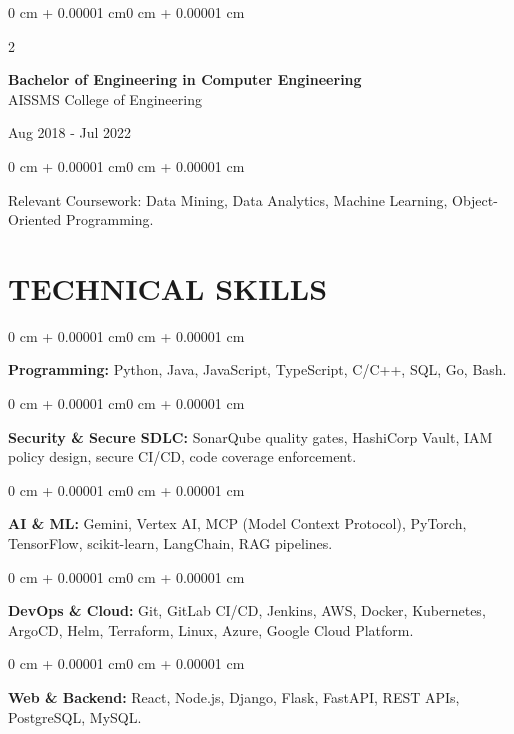 \documentclass[10pt, letterpaper]{article}
\newenvironment{onecolentry}{
    \begin{adjustwidth}{0 cm + 0.00001 cm}{0 cm + 0.00001 cm}
}{
    \end{adjustwidth}
}
\newenvironment{twocolentry}[2][]{
    \onecolentry
    \def\secondColumn{#2}
    \setcolumnwidth{\fill, 4.5 cm}
    \begin{paracol}{2}
}{
    \switchcolumn \raggedleft \secondColumn
    \end{paracol}
    \endonecolentry
}
\begin{document}
\begin{twocolentry}{
    Aug 2018 - Jul 2022
}
    \textbf{Bachelor of Engineering in Computer Engineering} \\
    AISSMS College of Engineering
\end{twocolentry}
\begin{onecolentry}
Relevant Coursework: Data Mining, Data Analytics, Machine Learning, Object-Oriented Programming.
\end{onecolentry}
\section{TECHNICAL SKILLS}
\begin{onecolentry}
\textbf{Programming:} Python, Java, JavaScript, TypeScript, C/C++, SQL, Go, Bash.
\end{onecolentry}
\vspace{0.06 cm}
\begin{onecolentry}
\textbf{Security \& Secure SDLC:} SonarQube quality gates, HashiCorp Vault, IAM policy design, secure CI/CD, code coverage enforcement.
\end{onecolentry}
\vspace{0.06 cm}
\begin{onecolentry}
\textbf{AI \& ML:} Gemini, Vertex AI, MCP (Model Context Protocol), PyTorch, TensorFlow, scikit-learn, LangChain, RAG pipelines.
\end{onecolentry}
\vspace{0.06 cm}
\begin{onecolentry}
\textbf{DevOps \& Cloud:} Git, GitLab CI/CD, Jenkins, AWS, Docker, Kubernetes, ArgoCD, Helm, Terraform, Linux, Azure, Google Cloud Platform.
\end{onecolentry}
\vspace{0.06 cm}
\begin{onecolentry}
\textbf{Web \& Backend:} React, Node.js, Django, Flask, FastAPI, REST APIs, PostgreSQL, MySQL.
\end{onecolentry}

\end{document}
